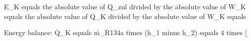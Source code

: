 E_K equals the absolute value of Q_zul divided by the absolute value of W_K equals the absolute value of Q_K divided by the absolute value of W_K equals  

Energy balance:  
Q_K equals ṁ_R134a times (h_1 minus h_2)  
equals 4 times [